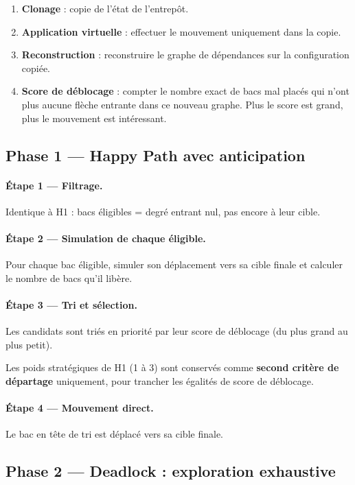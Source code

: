 \documentclass[12pt,a4paper]{article}
\begin{document}
\begin{enumerate}[noitemsep]
  \item \textbf{Clonage} : copie de l'état de l'entrepôt.
  \item \textbf{Application virtuelle} : effectuer le mouvement
        uniquement dans la copie.
  \item \textbf{Reconstruction} : reconstruire le graphe de dépendances
        sur la configuration copiée.
  \item \textbf{Score de déblocage} : compter le nombre exact de bacs
        mal placés qui n'ont plus aucune flèche entrante dans ce nouveau graphe.
        Plus le score est grand, plus le mouvement est intéressant.
\end{enumerate}

\subsection{Phase 1 — Happy Path avec anticipation}

\paragraph{Étape 1 — Filtrage.}
Identique à H1 : bacs éligibles = degré entrant nul, pas encore
à leur cible.

\paragraph{Étape 2 — Simulation de chaque éligible.}
Pour chaque bac éligible, simuler son déplacement vers sa cible
finale et calculer le nombre de bacs qu'il libère.

\paragraph{Étape 3 — Tri et sélection.}
Les candidats sont triés en priorité par leur score de déblocage (du plus grand au plus petit).

Les poids stratégiques de H1 (1 à 3) sont conservés comme
\textbf{second critère de départage} uniquement, pour trancher
les égalités de score de déblocage.

\paragraph{Étape 4 — Mouvement direct.}
Le bac en tête de tri est déplacé vers sa cible finale.

\subsection{Phase 2 — Deadlock : exploration exhaustive}
\end{document}
